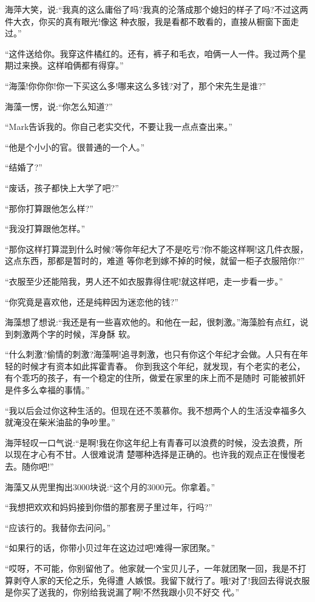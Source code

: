 \documentclass[11pt,a4paper,onecolumn]{article}
\begin{document}
海萍大笑，说:``我真的这么庸俗了吗?我真的沦落成那个媳妇的样子了吗?不过这两件大衣，你买的真有眼光!像这
种衣服，我是看都不敢看的，直接从橱窗下面走过。''

``这件送给你。我穿这件橘红的。还有，裤子和毛衣，咱俩一人一件。我过两个星期过来换。这样咱俩都有得穿。''

``海藻!你你你!你一下买这么多!哪来这么多钱?对了，那个宋先生是谁?''

海藻一愣，说:``你怎么知道?''

``Mark告诉我的。你自己老实交代，不要让我一点点查出来。''

``他是个小小的官。很普通的一个人。''

``结婚了?''

``废话，孩子都快上大学了吧?''

``那你打算跟他怎么样?''

``我没打算跟他怎样。''

``那你这样打算混到什么时候?等你年纪大了不是吃亏?你不能这样啊!这几件衣服，这点东西，那都是暂时的，难道
等你老到嫁不掉的时候，就留一柜子衣服陪你?''

``衣服至少还能陪我，男人还不如衣服靠得住呢!就这样吧，走一步看一步。''

``你究竟是喜欢他，还是纯粹因为迷恋他的钱?''

海藻想了想说:``我还是有一些喜欢他的。和他在一起，很刺激。''海藻脸有点红，说到刺激两个字的时候，浑身酥
软。

``什么刺激?偷情的刺激?海藻啊!追寻刺激，也只有你这个年纪才会做。人只有在年轻的时候才有资本如此挥霍青春。
你到我这个年纪，就发现，有个老实的老公，有个乖巧的孩子，有一个稳定的住所，做爱在家里的床上而不是随时
可能被抓奸是件多么幸福的事情。''

``我以后会过你这种生活的。但现在还不羡慕你。我不想两个人的生活没幸福多久就淹没在柴米油盐的争吵里。''

海萍轻叹一口气说:``是啊!我在你这年纪上有青春可以浪费的时候，没去浪费，所以现在才心有不甘。人很难说清
楚哪种选择是正确的。也许我的观点正在慢慢老去。随你吧!''

海藻又从兜里掏出3000块说:``这个月的3000元。你拿着。''

``我想把欢欢和妈妈接到你借的那套房子里过年，行吗?''

``应该行的。我替你去问问。''

``如果行的话，你带小贝过年在这边过吧!难得一家团聚。''

``哎呀，不可能，你别留他了。他家就一个宝贝儿子，一年就团聚一回，我是不打算剥夺人家的天伦之乐，免得遭
人嫉恨。我留下就行了。哦!对了!我回去得说衣服是你买了送我的，你别给我说漏了啊!不然我跟小贝不好交
代。''
\end{document}
